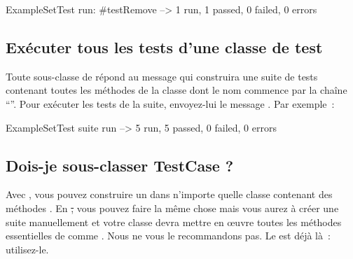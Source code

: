 \documentclass[a4paper,10pt,twoside]{book}
\begin{document}
\begin{code}{}
ExampleSetTest run: #testRemove --> 1 run, 1 passed, 0 failed, 0 errors
\end{code}

\subsection{Exécuter tous les tests d'une classe de test}

Toute sous-classe de  répond au message  qui construira 
une suite de tests contenant toutes les méthodes de la classe dont le nom commence par la chaîne ``''.
Pour exécuter les tests de la suite, envoyez-lui le message .
Par exemple~:

\begin{code}{}
ExampleSetTest suite run --> 5 run, 5 passed, 0 failed, 0 errors
\end{code}

\subsection{Dois-je sous-classer TestCase ?}
Avec \JUnit{}, vous pouvez construire un  dans n'importe quelle classe contenant 
des méthodes . En \st, vous pouvez faire la même chose mais vous aurez à créer une suite 
manuellement et votre classe devra mettre en {\oe}uvre toutes les méthodes essentielles de  
comme .
Nous ne vous le recommandons pas. Le \framework est déjà là~: utilisez-le.
\end{document}

